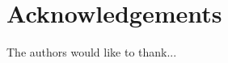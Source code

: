 \documentclass{acm_proc_article-sp}
\begin{document}
\section{Acknowledgements}


The authors would like to thank...






%
%





\balancecolumns
\end{document}
